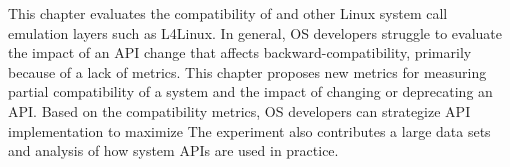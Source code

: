 This chapter evaluates the compatibility of \graphene{}
and other Linux system call emulation layers such as L4Linux.
In general, OS developers struggle to evaluate the impact of an API 
change that affects backward-compatibility,
primarily because of a lack of metrics.
This chapter proposes new metrics for measuring 
partial compatibility of a system and the impact of changing or deprecating an API.
Based on the compatibility metrics,
OS developers can strategize API implementation to maximize 
The experiment also contributes a large data sets and analysis of
how system APIs are used in practice.


